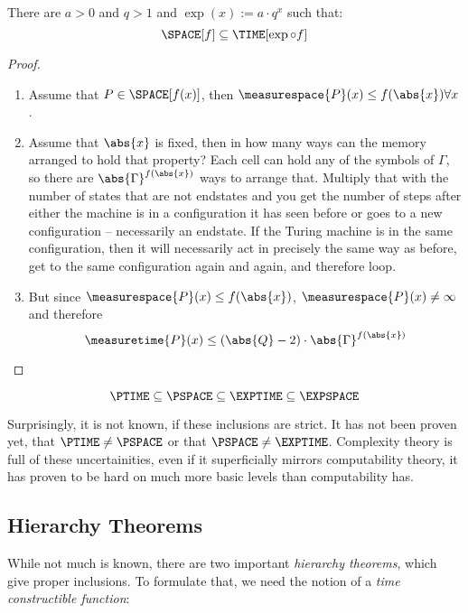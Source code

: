 \begin{theorem}
	There are $a>0$ and $q > 1$ and $\exp(x) := a\cdot q^x$ such that:
	\[\SPACE[f] \subseteq \TIME[\exp\circ f]\]
\end{theorem}
\begin{proof}
	\begin{enumerate}
		\item Assume that $P\in\SPACE[f(x)]$, then $\measurespace{P}(x)\leq f(\abs{x})\forall x$.
		\item Assume that $\abs{x}$ is fixed, then in how many ways can the 
			memory arranged to hold that property? Each cell can hold any of the 
			symbols of $\Gamma$, so there are $\abs{\Gamma}^{f(\abs{x})}$ ways to 
			arrange that. Multiply that with the number of states that are not
			endstates and you get the number of steps after either the machine is in
			a configuration it has seen before or goes to a new configuration --
			necessarily an endstate. If the Turing machine is in the same
			configuration, then it will necessarily act in precisely the same way 
			as before, get to the same configuration again and again, and therefore loop. 
		\item But since $\measurespace{P}(x)\leq f(\abs{x})$, 
			$\measurespace{P}(x) \neq \infty$ and therefore 
			\[\measuretime{P}(x)\leq (\abs{Q} - 2)\cdot\abs{\Gamma}^{f(\abs{x})}\]
	\end{enumerate}
\end{proof}

\begin{corrolary}
	\[ %
		\PTIME\subseteq\PSPACE\subseteq\EXPTIME\subseteq\EXPSPACE \]
\end{corrolary}

Surprisingly, it is not known, if these inclusions are strict. It has not 
been proven yet, that $\PTIME\neq \PSPACE$ or that $\PSPACE\neq\EXPTIME$. 
Complexity theory is full of these uncertainities, even if it superficially 
mirrors computability theory, it has proven to be hard on much more basic
levels than computability has.

\subsection{Hierarchy Theorems}
While not much is known, there are two important \emph{hierarchy theorems}, 
which give proper inclusions. To formulate that, we need the notion of a \emph{
time constructible function}\/:

